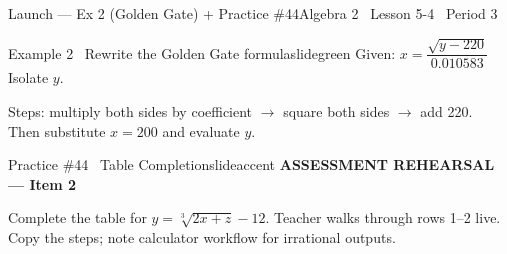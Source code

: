 \documentclass[aspectratio=169, 11pt]{beamer}
\begin{document}
\begin{frame}{Launch --- Ex 2 (Golden Gate) + Practice \#44}{Algebra 2 \textperiodcentered\ Lesson 5-4 \textperiodcentered\ Period 3}
\vspace{0.15cm}
\begin{projcard}{Example 2 \textperiodcentered\ Rewrite the Golden Gate formula}{slidegreen}
\small
Given: \(x = \dfrac{\sqrt{y - 220}}{0.010583}\) \quad Isolate \(y\).

\vspace{0.1cm}
Steps: multiply both sides by coefficient \(\rightarrow\) square both sides
\(\rightarrow\) add 220.\\
Then substitute \(x = 200\) and evaluate \(y\).
\end{projcard}
\vspace{-0.1cm}
\begin{projcard}{Practice \#44 \textperiodcentered\ Table Completion}{slideaccent}
\small
\textcolor{slideaccent}{\bfseries ASSESSMENT REHEARSAL --- Item 2}

Complete the table for \(y = \sqrt[3]{2x + z} - 12\).
Teacher walks through rows 1--2 live. Copy the steps; note calculator workflow for irrational outputs.
\end{projcard}
\end{frame}
\end{document}
